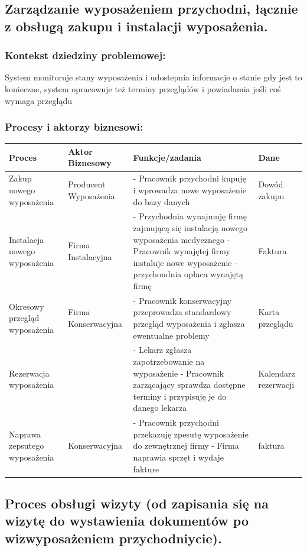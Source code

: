 \documentclass{article}
\begin{document}
\subsection*{Zarządzanie wyposażeniem przychodni, łącznie z obsługą zakupu i instalacji wyposażenia.}

\subsubsection*{Kontekst dziedziny problemowej:}
System monitoruje stany wyposażenia i udostepnia informacje o stanie gdy jest to konieczne, system opracowuje też terminy przeglądów i powiadamia jeśli coś wymaga przeglądu
\subsubsection*{Procesy i aktorzy biznesowi:}
\begin{tabular}{|m{6em}|m{10em}|m{18em}|m{7em}|}
	\hline
	\rowcolor{lightgray} Proces & Aktor Biznesowy & Funkcje/zadania & Dane\\
	\hline
	Zakup nowego wyposażenia & Producent Wyposażenia &- Pracownik przychodni  kupuję i wprowadza nowe wyposażenie do bazy danych & Dowód zakupu\\
	\hline
	Instalacja nowego wyposażenia & Firma Instalacyjna &- Przychodnia wynajmuję firmę zajmującą się instalacją nowego wyposażenia medycznego \newline- Pracownik wynajętej firmy instaluje nowe wyposażenie \newline- przychondnia opłaca wynajętą firmę & Faktura \\
	\hline
	Okresowy przegląd wyposażenia & Firma Konserwacyjna &- Pracownik konserwacyjny przeprowadza standardowy przegląd wyposażenia i zgłasza ewentualne problemy & Karta przeglądu\\
	\hline
	Rezerwacja wyposażenia & &- Lekarz zgłasza zapotrzebowanie na wyposażenie \newline- Pracownik zarzącający sprawdza dostępne terminy i przypisuję je do danego lekarza & Kalendarz rezerwacji\\
	\hline
	Naprawa zepsutego wyposażenia & Konserwacyjna &- Pracownik przychodni przekazuję zpesutę wyposażenie do zewnętrznej firmy \newline- Firma naprawia sprzęt i wydaje fakture & faktura\\
	\hline 
\end{tabular}
\newpage
\subsection*{Proces obsługi wizyty (od zapisania się na wizytę do wystawienia dokumentów po wizwyposażeniem przychodniycie).}
\end{document}
